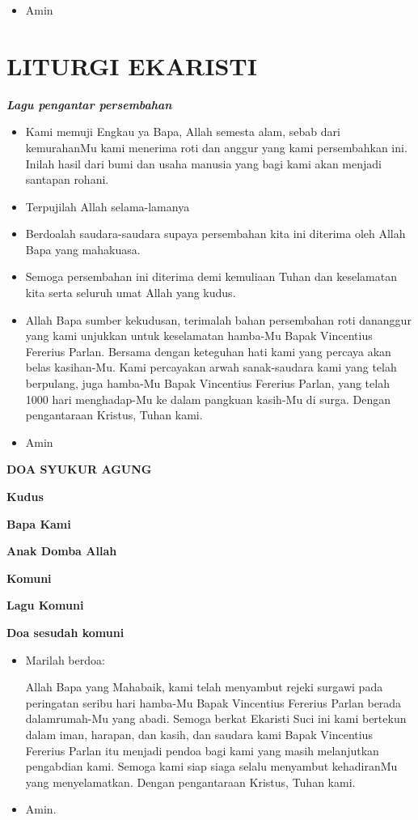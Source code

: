 \documentclass[titlepage,10pt,openany]{scrbook}
\makeatletter
\newcommand{\subjudul}[1]{%
  {\parindent \z@ 
    \interlinepenalty\@M \bfseries #1\par\nobreak \vskip 10\p@ }}
\newcommand{\lagu}[1]{%
  {\parindent \z@ 
    \interlinepenalty\@M \slshape \bfseries \normalsize \textit{#1}\par\nobreak \vskip 10\p@ }}
\newcommand{\BU}[1]{\begin{itemize} \item[U:] #1 \end{itemize}}
\newcommand{\BI}[1]{\begin{itemize} \item[I:] #1 \end{itemize}}
\newcommand{\namaalm}{Bapak Vincentius Fererius Parlan\xspace}
\makeatother
\begin{document}
\BU{Amin}

\section*{LITURGI EKARISTI}

\lagu{Lagu pengantar persembahan}


\BI{Kami memuji Engkau ya Bapa, Allah semesta alam, sebab 
dari kemurahanMu kami menerima roti dan anggur yang 
kami persembahkan ini. Inilah hasil dari bumi dan usaha 
manusia yang bagi kami akan menjadi santapan rohani.}

\BU{Terpujilah Allah selama-lamanya}

\BI{Berdoalah saudara-saudara supaya persembahan kita ini 
diterima oleh Allah Bapa yang mahakuasa.}

\BU{Semoga persembahan ini diterima demi kemuliaan Tuhan 
dan keselamatan kita serta seluruh umat Allah yang kudus.}

\BI{Allah Bapa sumber kekudusan, terimalah bahan persembahan roti dananggur yang kami unjukkan untuk keselamatan hamba-Mu \namaalm. Bersama dengan keteguhan hati kami yang percaya akan belas kasihan-Mu. Kami percayakan arwah sanak-saudara kami yang telah  berpulang,  juga   hamba-Mu  \namaalm,  yang  telah 1000 hari   menghadap-Mu   ke   dalam     pangkuan   kasih-Mu   di   surga. Dengan pengantaraan Kristus, Tuhan kami.}

\BU{Amin} 

\subjudul{DOA SYUKUR AGUNG}


\subjudul{Kudus}

\subjudul{Bapa Kami}

\subjudul{Anak Domba Allah}

\subjudul{Komuni}
\newpage
\subjudul{Lagu Komuni}
 
 

\subjudul{Doa sesudah komuni}

\BI{Marilah berdoa: 
	
	Allah Bapa yang Mahabaik, kami telah menyambut rejeki surgawi pada peringatan   seribu   hari   hamba-Mu  \namaalm   berada  dalamrumah-Mu yang abadi.  Semoga berkat Ekaristi Suci ini kami bertekun dalam iman, harapan, dan kasih, dan saudara kami \namaalm itu   menjadi   pendoa   bagi   kami   yang   masih   melanjutkan   pengabdian kami. Semoga  kami  siap  siaga  selalu  menyambut kehadiranMu  yang menyelamatkan. Dengan pengantaraan Kristus, Tuhan kami.}

\BU{Amin.}
\end{document}
